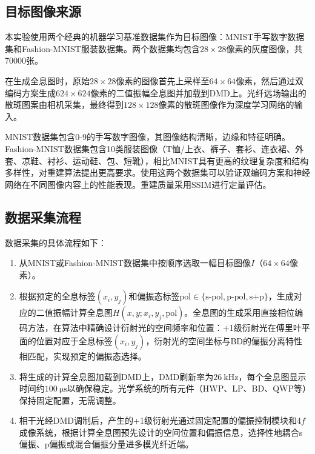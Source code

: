 {\subsection{目标图像来源}\label{sec:target_images}

本实验使用两个经典的机器学习基准数据集作为目标图像：MNIST手写数字数据集和Fashion-MNIST服装数据集。两个数据集均包含$28\times28$像素的灰度图像，共70000张。

在生成全息图时，原始$28\times28$像素的图像首先上采样至$64\times64$像素，然后通过双编码方案生成$624\times624$像素的二值振幅全息图并加载到DMD上。光纤远场输出的散斑图案由相机采集，最终得到$128\times128$像素的散斑图像作为深度学习网络的输入。

MNIST数据集包含0-9的手写数字图像，其图像结构清晰，边缘和特征明确。Fashion-MNIST数据集包含10类服装图像（T恤/上衣、裤子、套衫、连衣裙、外套、凉鞋、衬衫、运动鞋、包、短靴），相比MNIST具有更高的纹理复杂度和结构多样性，对重建算法提出更高要求。使用这两个数据集可以验证双编码方案和神经网络在不同图像内容上的性能表现。重建质量采用SSIM进行定量评估。

\subsection{数据采集流程}\label{sec:data_acquisition}

数据采集的具体流程如下：
\begin{enumerate}
    \item 从MNIST或Fashion-MNIST数据集中按顺序选取一幅目标图像$I$（$64\times64$像素）。
    
    \item 根据预定的全息标签$(x_i, y_j)$和偏振态标签$\text{pol} \in \{\text{s-pol}, \text{p-pol}, \text{s+p}\}$，生成对应的二值振幅计算全息图$H(x,y; x_i, y_j, \text{pol})$。全息图的生成采用直接相位编码方法，在算法中精确设计衍射光的空间频率和位置：+1级衍射光在傅里叶平面的位置对应于全息标签$(x_i, y_j)$，衍射光的空间坐标与BD的偏振分离特性相匹配，实现预定的偏振态选择。
    
    \item 将生成的计算全息图加载到DMD上，DMD刷新率为$26~\mathrm{kHz}$，每个全息图显示时间约$100~\mathrm{μs}$以确保稳定。光学系统的所有元件（HWP、LP、BD、QWP等）保持固定配置，无需调整。
    
    \item 相干光经DMD调制后，产生的+1级衍射光通过固定配置的偏振控制模块和4$f$成像系统，根据计算全息图预先设计的空间位置和偏振信息，选择性地耦合s偏振、p偏振或混合偏振分量进多模光纤近端。
    

\end{enumerate}}
